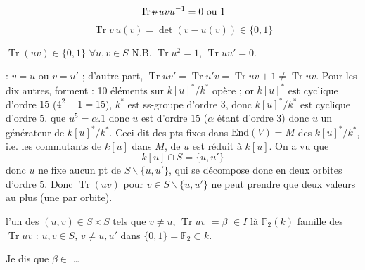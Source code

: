 \documentclass[11pt,a4paper]{article}
\begin{document}
\[
\operatorname{Tr} \text{\struck{$v$}}\, u v u^{-1} = 0 \text{ ou } 1
\]
\[
\operatorname{Tr} v\, u(v) = \det(v - u(v)) \in \{0, 1\}
\]

$\operatorname{Tr}(uv) \in \{0,1\}$ \quad $\forall u, v \in S$ \qquad
N.B. $\operatorname{Tr} u^2 = 1$, $\operatorname{Tr} u u' = 0$.

 : $v = u$ ou $v = u'$ ; d'autre part,
$\operatorname{Tr} u v' = \operatorname{Tr} u' v = \operatorname{Tr} u v + 1 \neq \operatorname{Tr} u v$.
Pour les dix autres,  forment \ill{} : 10 éléments sur  $k[u]^*/k^*$ opère ; or $k[u]^*$ est cyclique d'ordre $15$ ($4^2 - 1 = 15$), $k^*$ est ss-groupe d'ordre $3$, donc $k[u]^*/k^*$ est cyclique d'ordre $5$.  que $u^5 = \alpha.1$ donc $u$ est d'ordre $15$ ($\alpha$ étant d'ordre $3$) donc $u$ \struck{\ill{}}  un générateur de $k[u]^*/k^*$. Ceci dit   des pts fixes dans $\mathrm{End}(V) = M$ \struck{\ill{}} des $k[u]^*/k^*$, i.e. les commutants de $k[u]$ dans $M$, de $u$ est réduit à $k[u]$. On a vu que
\[
k[u] \cap S = \{u, u'\}
\]
donc $u$ ne fixe aucun pt de $S \smallsetminus \{u, u'\}$, qui se décompose donc en deux orbites d'ordre $5$. Donc $\operatorname{Tr}(uv)$ pour $v \in S \smallsetminus \{u, u'\}$ ne peut prendre que deux valeurs au plus (une par orbite).


 l'un des $(u, v) \in S \times S$ tels que $v \neq u$, $\operatorname{Tr} u v$ \struck{$\in$} $= \beta$  $\in I$ là \struck{\ill{}} $\mathbb{P}_2(k)$ \struck{\ill{}} famille des $\operatorname{Tr} u v$ : $u, v \in S$, $v \neq u, u'$ \quad \ill{} dans \ill{}
$\{0, 1\} = \mathbb{F}_2 \subset k$.

Je dis que $\beta \in$ \ldots
{}
\end{document}
